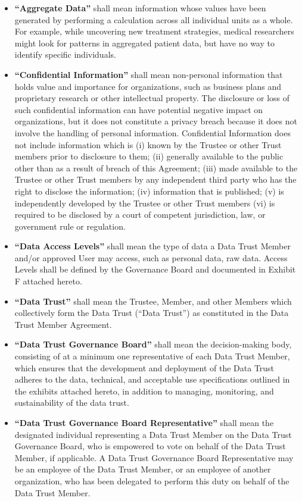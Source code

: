 \documentclass[]{book}
\begin{document}
\begin{itemize}
\item
  \textbf{``Aggregate Data''} shall mean information whose values have been generated by performing a calculation across all individual units as a whole. For example, while uncovering new treatment strategies, medical researchers might look for patterns in aggregated patient data, but have no way to identify specific individuals.
\item
  \textbf{``Confidential Information''} shall mean non-personal information that holds value and importance for organizations, such as business plans and proprietary research or other intellectual property. The disclosure or loss of such confidential information can have potential negative impact on organizations, but it does not constitute a privacy breach because it does not involve the handling of personal information. Confidential Information does not include information which is (i) known by the Trustee or other Trust members prior to disclosure to them; (ii) generally available to the public other than as a result of breach of this Agreement; (iii) made available to the Trustee or other Trust members by any independent third party who has the right to disclose the information; (iv) information that is published; (v) is independently developed by the Trustee or other Trust members (vi) is required to be disclosed by a court of competent jurisdiction, law, or government rule or regulation.
\item
  \textbf{``Data Access Levels''} shall mean the type of data a Data Trust Member and/or approved User may access, such as personal data, raw data. Access Levels shall be defined by the Governance Board and documented in Exhibit F attached hereto.
\item
  \textbf{``Data Trust''} shall mean the Trustee, Member, and other Members which collectively form the Data Trust (``Data Trust'') as constituted in the Data Trust Member Agreement.
\item
  \textbf{``Data Trust Governance Board''} shall mean the decision-making body, consisting of at a minimum one representative of each Data Trust Member, which ensures that the development and deployment of the Data Trust adheres to the data, technical, and acceptable use specifications outlined in the exhibits attached hereto, in addition to managing, monitoring, and sustainability of the data trust.
\item
  \textbf{``Data Trust Governance Board Representative''} shall mean the designated individual representing a Data Trust Member on the Data Trust Governance Board, who is empowered to vote on behalf of the Data Trust Member, if applicable. A Data Trust Governance Board Representative may be an employee of the Data Trust Member, or an employee of another organization, who has been delegated to perform this duty on behalf of the Data Trust Member.

\end{itemize}
\end{document}
